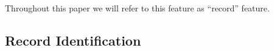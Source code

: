 Throughout this paper we will refer to this feature as ``record'' feature.






\subsection{Record Identification}\label{ss:reci}

